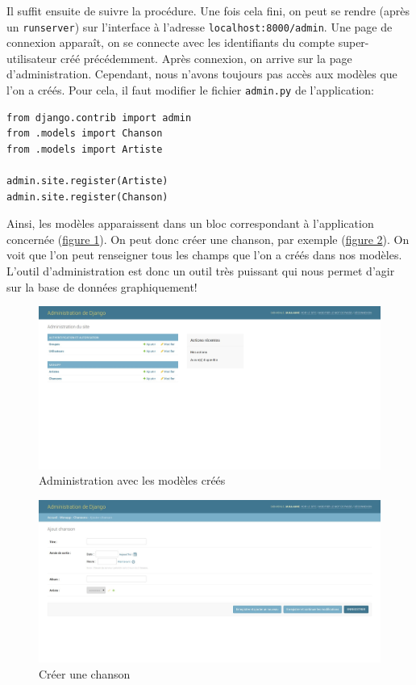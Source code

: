 \documentclass[a4paper, 10pt]{article}
\begin{document}
Il suffit ensuite de suivre la procédure. Une fois cela fini, on peut se rendre (après un \texttt{runserver}) sur l'interface à l'adresse \texttt{localhost:8000/admin}. Une page de connexion apparaît, on se connecte avec les identifiants du compte super-utilisateur créé précédemment. Après connexion, on arrive sur la page d'administration. Cependant, nous n'avons toujours pas accès aux modèles que l'on a créés. Pour cela, il faut modifier le fichier \texttt{admin.py} de l'application:
\begin{verbatim}
from django.contrib import admin
from .models import Chanson
from .models import Artiste

admin.site.register(Artiste)
admin.site.register(Chanson)
\end{verbatim}
Ainsi, les modèles apparaissent dans un bloc correspondant à l'application concernée (\hyperref[admin2]{figure 1}). On peut donc créer une chanson, par exemple (\hyperref[admin3]{figure 2}). On voit que l'on peut renseigner tous les champs que l'on a créés dans nos modèles. L'outil d’administration est donc un outil très puissant qui nous permet d'agir sur la base de données graphiquement!
\begin{figure}[h]
    \begin{center}
        \includegraphics[width=15 cm]{django/admin2.jpg}
        \caption{Administration avec les modèles créés}\label{admin2}
    \end{center}
\end{figure}
\begin{figure}[h]
    \begin{center}
        \includegraphics[width=15 cm]{django/admin3.jpg}
        \caption{Créer une chanson}\label{admin3}
    \end{center}
\end{figure}
\end{document}

